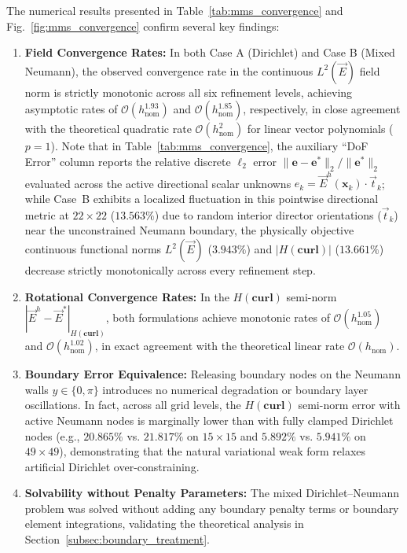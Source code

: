 \documentclass[VANCOUVER,Times1COL]{WileyNJD-v5}
\begin{document}
The numerical results presented in Table~\ref{tab:mms_convergence} and Fig.~\ref{fig:mms_convergence} confirm several key findings:
\begin{enumerate}
    \item \textbf{Field Convergence Rates:} In both Case A (Dirichlet) and Case B (Mixed Neumann), the observed convergence rate in the continuous $L^2(\vec{E})$ field norm is strictly monotonic across all six refinement levels, achieving asymptotic rates of $\mathcal{O}(h_{\mathrm{nom}}^{1.93})$ and $\mathcal{O}(h_{\mathrm{nom}}^{1.85})$, respectively, in close agreement with the theoretical quadratic rate $\mathcal{O}(h_{\mathrm{nom}}^2)$ for linear vector polynomials ($p=1$). Note that in Table~\ref{tab:mms_convergence}, the auxiliary ``DoF Error'' column reports the relative discrete $\ell_2$ error $\|\mathbf{e} - \mathbf{e}^*\|_2 / \|\mathbf{e}^*\|_2$ evaluated across the active directional scalar unknowns $e_k = \vec{E}^h(\mathbf{x}_k) \cdot \vec{t}_k$; while Case~B exhibits a localized fluctuation in this pointwise directional metric at $22 \times 22$ ($13.563\%$) due to random interior director orientations ($\vec{t}_k$) near the unconstrained Neumann boundary, the physically objective continuous functional norms $L^2(\vec{E})$ ($3.943\%$) and $|H(\mathbf{curl})|$ ($13.661\%$) decrease strictly monotonically across every refinement step.
    \item \textbf{Rotational Convergence Rates:} In the $H(\mathbf{curl})$ semi-norm $|\vec{E}^h - \vec{E}^*|_{H(\mathbf{curl})}$, both formulations achieve monotonic rates of $\mathcal{O}(h_{\mathrm{nom}}^{1.05})$ and $\mathcal{O}(h_{\mathrm{nom}}^{1.02})$, in exact agreement with the theoretical linear rate $\mathcal{O}(h_{\mathrm{nom}})$.
    \item \textbf{Boundary Error Equivalence:} Releasing boundary nodes on the Neumann walls $y \in \{0, \pi\}$ introduces no numerical degradation or boundary layer oscillations. In fact, across all grid levels, the $H(\mathbf{curl})$ semi-norm error with active Neumann nodes is marginally lower than with fully clamped Dirichlet nodes (e.g., $20.865\%$ vs. $21.817\%$ on $15 \times 15$ and $5.892\%$ vs. $5.941\%$ on $49 \times 49$), demonstrating that the natural variational weak form relaxes artificial Dirichlet over-constraining.
    \item \textbf{Solvability without Penalty Parameters:} The mixed Dirichlet--Neumann problem was solved without adding any boundary penalty terms or boundary element integrations, validating the theoretical analysis in Section~\ref{subsec:boundary_treatment}.

\end{enumerate}
\end{document}
